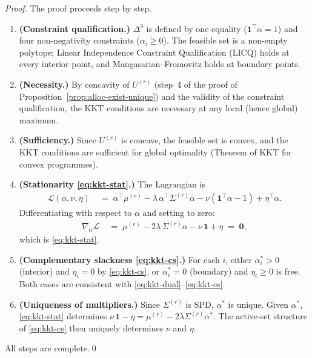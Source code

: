 \documentclass[12pt,openany]{book}
\numberwithin{equation}{chapter}
\theoremstyle{plain}
\theoremstyle{definition}
\theoremstyle{remark}
\numberwithin{equation}{chapter}
\theoremstyle{plain}
\begin{document}
\begin{proof}
The proof proceeds step by step.
\begin{enumerate}
  \item \textbf{(Constraint qualification.)}
        $\Delta^{3}$ is defined by one equality ($\mathbf{1}^\top\alpha = 1$)
        and four non-negativity constraints ($\alpha_i \geq 0$).
        The feasible set is a non-empty polytope; Linear Independence
        Constraint Qualification (LICQ) holds at every interior point,
        and Mangasarian--Fromovitz holds at boundary points.

  \item \textbf{(Necessity.)}
        By concavity of $U^{(r)}$ (step~4 of the proof of
        Proposition~\ref{prop:alloc-exist-unique}) and the validity of
        the constraint qualification, the KKT conditions are necessary
        at any local (hence global) maximum.

  \item \textbf{(Sufficiency.)}
        Since $U^{(r)}$ is concave, the feasible set is convex, and the
        KKT conditions are sufficient for global optimality
        (Theorem of KKT for convex programmes).

  \item \textbf{(Stationarity \eqref{eq:kkt-stat}.)}
        The Lagrangian is
        \begin{align}
          \mathcal{L}(\alpha,\nu,\eta)
          &\;=\; \alpha^\top\mu^{(r)}
                 - \lambda\,\alpha^\top\Sigma^{(r)}\alpha
                 - \nu\!\left(\mathbf{1}^\top\alpha - 1\right)
                 + \eta^\top\alpha.
          \label{eq:lagrangian}
        \end{align}
        Differentiating with respect to $\alpha$ and setting to zero:
        \begin{align}
          \nabla_\alpha \mathcal{L}
          &\;=\; \mu^{(r)} - 2\lambda\,\Sigma^{(r)}\alpha
                 - \nu\,\mathbf{1} + \eta
          \;=\; \mathbf{0},
          \label{eq:kkt-stat-deriv}
        \end{align}
        which is \eqref{eq:kkt-stat}.

  \item \textbf{(Complementary slackness \eqref{eq:kkt-cs}.)}
        For each $i$, either $\alpha^*_i > 0$ (interior) and
        $\eta_i = 0$ by \eqref{eq:kkt-cs}, or $\alpha^*_i = 0$
        (boundary) and $\eta_i \geq 0$ is free.  Both cases are
        consistent with \eqref{eq:kkt-dual}--\eqref{eq:kkt-cs}.

  \item \textbf{(Uniqueness of multipliers.)}
        Since $\Sigma^{(r)}$ is SPD, $\alpha^{*}$ is unique.
        Given $\alpha^{*}$, \eqref{eq:kkt-stat} determines
        $\nu\,\mathbf{1} - \eta = \mu^{(r)} - 2\lambda\Sigma^{(r)}\alpha^*$.
        The active-set structure of \eqref{eq:kkt-cs} then uniquely
        determines $\nu$ and $\eta$.
\end{enumerate}
\noindent All steps are complete.\qed
\end{proof}
\end{document}
